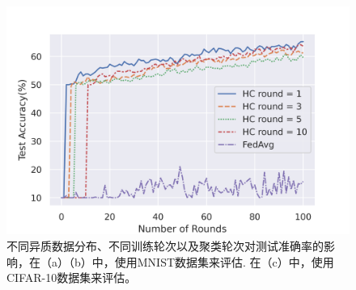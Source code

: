\begin{figure}[htb]
{		\begin{minipage}[b]{0.27\textwidth}
			\centering
			\includegraphics[scale=0.32]{figs/cifar-noniid-one-rand.png}
		\end{minipage}
	}
	\caption[方案准确率评估]{不同异质数据分布、不同训练轮次以及聚类轮次对测试准确率的影响，在（a）（b）中，使用MNIST数据集来评估. 在（c）中，使用CIFAR-10数据集来评估。}
	\label{fig-acc}
\end{figure}


